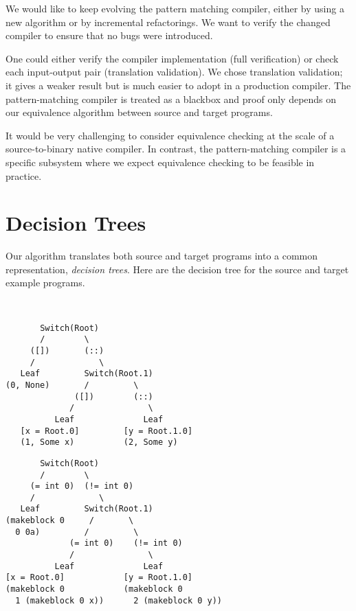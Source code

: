 \documentclass[12pt]{article}
\begin{document}
We would like to keep evolving the pattern matching compiler, either by
using a new algorithm or by incremental refactorings.
We want to verify the changed compiler to ensure that no bugs were
introduced.

One could either verify the compiler implementation
(full verification) or check each input-output pair
(translation validation). We chose translation validation; it gives
a weaker result but is much easier to adopt in a production
compiler. The pattern-matching compiler is treated as a blackbox and proof only depends
on our equivalence algorithm between source and target programs.

It would be very challenging to consider equivalence checking at the
scale of a source-to-binary native compiler. In contrast, the
pattern-matching compiler is a specific subsystem where we expect
equivalence checking to be feasible in practice.

\section{Decision Trees}

Our algorithm translates both source and target
programs into a common representation, \emph{decision trees}.
Here are the decision tree for the source and target example programs.

~

\hspace{-2em}
\begin{minipage}{0.5\linewidth}
\begin{verbatim}
       Switch(Root)
       /        \
     ([])       (::)
     /             \
   Leaf         Switch(Root.1)
(0, None)       /         \
              ([])        (::)
             /               \
          Leaf              Leaf
   [x = Root.0]         [y = Root.1.0]
   (1, Some x)          (2, Some y)
\end{verbatim}
\end{minipage}
\hfill
\begin{minipage}{0.5\linewidth}
\begin{verbatim}
       Switch(Root)
       /        \
     (= int 0)  (!= int 0)
     /             \
   Leaf         Switch(Root.1)
(makeblock 0     /       \
  0 0a)         /         \
             (= int 0)    (!= int 0)
             /               \
          Leaf              Leaf
[x = Root.0]            [y = Root.1.0]
(makeblock 0            (makeblock 0
  1 (makeblock 0 x))      2 (makeblock 0 y))
\end{verbatim}
\end{minipage}
\end{document}
